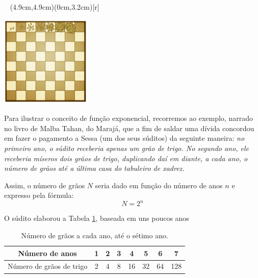 \documentclass[../main.tex]{subfiles}
\begin{document}
\begin{ex}~
\pichskip{0.5cm}%
\parpic(4.9cm,4.9cm)(0cm,3.2cm)[r]{%
\begin{minipage}{0.45\textwidth}
\includegraphics[scale=1.1]{fig_func/ExFuncTabXadrez}
\vspace{-0.3cm}
\label{fig:xadrez}
\end{minipage}
}
\noindent Para ilustrar o conceito de função exponencial, recorremos ao exemplo, narrado no livro de Malba Tahan, do Marajá, que a fim de saldar uma dívida concordou em fazer o pagamento a Sessa (um dos seus súditos) da seguinte maneira: \textit{no primeiro ano, o súdito  receberia apenas um grão de trigo.  No segundo ano, ele receberia  míseros dois grãos de trigo, duplicando daí em diante, a cada ano, o  número de grãos até a última casa do tabuleiro de xadrez.}

\noindent Assim,  o número de grãos $N$ seria dado em função do número de anos $n$ e expresso pela fórmula:
$$ N=2^n $$
\vspace{0.1cm}

O súdito elaborou a Tabela \ref{tab:Graos}, baseada em uns poucos anos
\begin{table}[htb]
    \centering
    \begin{tabular}{|c|c|c|c|c|c|c|c|}
    \hline
\rowcolor{cyan}\cellcolor{blue}   Número de anos &1& 2& 3& 4& 5& 6& 7\\\hline
\rowcolor{magenta}\cellcolor{red} Número de grãos de trigo&  2 &4 &8& 16& 32 &64 &128\\\hline
             \end{tabular}
    \caption{Número de grãos a cada ano, até o sétimo ano.}
    \label{tab:Graos}
\end{table}
\begin{center}
\end{center}


\end{ex}
\end{document}
